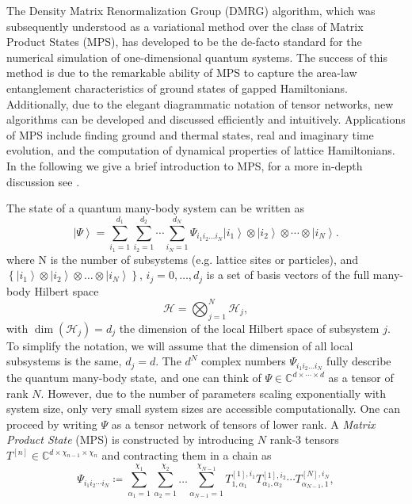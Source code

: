 The Density Matrix Renormalization Group (DMRG) algorithm, which was subsequently understood as a variational method over the class of Matrix Product States (MPS), has developed to be the de-facto standard for the numerical simulation of one-dimensional quantum systems. The success of this method is due to the remarkable ability of MPS to capture the area-law entanglement characteristics of ground states of gapped Hamiltonians. Additionally, due to the elegant diagrammatic notation of tensor networks, new algorithms can be developed and discussed efficiently and intuitively. Applications of MPS include finding ground and thermal states, real and imaginary time evolution, and the computation of dynamical properties of lattice Hamiltonians. In the following we give a brief introduction to MPS, for a more in-depth discussion see \cite{cite:DMRG_in_the_age_of_MPS, cite:practical_introduction_MPS_and_PEPS, cite:tenpy}. \par
The state of a quantum many-body system can be written as
\begin{equation}
	\left|\Psi\right\rangle = \sum_{i_1=1}^{d_1} \sum_{i_2=1}^{d_2} \cdots \sum_{i_N=1}^{d_N} \Psi_{i_1i_2\dots i_N} \left|i_1\right\rangle \otimes \left|i_2\right\rangle \otimes \cdots \otimes \left|i_N\right\rangle.
\end{equation}
where N is the number of subsystems (e.g. lattice sites or particles), and $\left\{\left|i_1\right\rangle \otimes \left|i_2\right\rangle \otimes \dots \otimes \left|i_N\right\rangle\right\}$, $i_j = 0, \dots, d_j$ is a set of basis vectors of the full many-body Hilbert space
\begin{equation}
	\mathcal{H} = \bigotimes_{j=1}^{N} \mathcal{H}_j,
\end{equation}
with $\dim\left(\mathcal{H}_j\right) = d_j$ the dimension of the local Hilbert space of subsystem $j$. To simplify the notation, we will assume that the dimension of all local subsystems is the same, $d_j = d$. The $d^N$ complex numbers $\Psi_{i_1i_2\dots i_N}$ fully describe the quantum many-body state, and one can think of $\Psi\in\mathbb{C}^{d\times\cdots\times d}$ as a tensor of rank $N$. However, due to the number of parameters scaling exponentially with system size, only very small system sizes are accessible computationally. One can proceed by writing $\Psi$ as a tensor network of tensors of lower rank. A \textit{Matrix Product State} (MPS) is constructed by introducing $N$ rank-3 tensors $T^{[n]}\in\mathbb{C}^{d\times \chi_{n-1}\times \chi_{n}}$ and contracting them in a chain as
\begin{equation}
	\label{eq:MPS_open_boundary_conditions_general_definition}
	\Psi_{i_1i_2\cdots i_N} \coloneqq \sum_{\alpha_1=1}^{\chi_1} \sum_{\alpha_2=1}^{\chi_2}\dots\sum_{\alpha_{N-1}=1}^{\chi_{N-1}}T^{[1],i_1}_{1,\alpha_1} T^{[1],i_2}_{\alpha_1,\alpha_2} \cdots T^{[N],i_N}_{\alpha_{N-1},1},
\end{equation}
